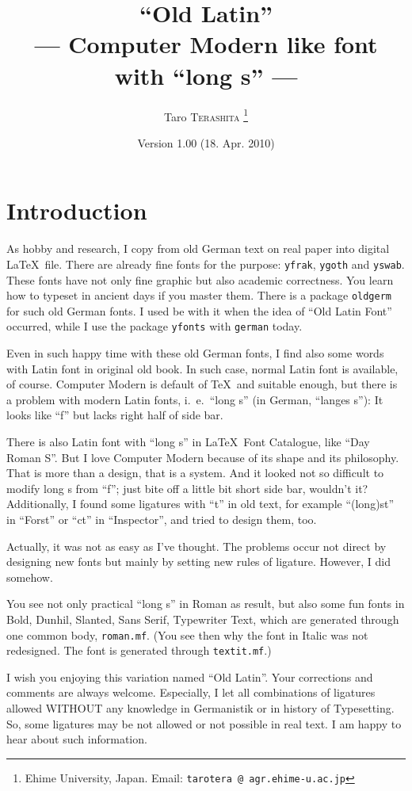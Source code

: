 \documentclass[a4paper]{article}
\title{``Old Latin''\\
--- Computer Modern like font with ``long s'' ---}
\author{Taro \textsc{Terashita}
\thanks{Ehime University, Japan.
Email: \texttt{tarotera @ agr.ehime-u.ac.jp}
}
}
\date{Version 1.00 (18. Apr. 2010)}
\begin{document}
\maketitle
\tableofcontents

\section{Introduction}

As hobby and research,
I copy from old German text on real paper into digital \LaTeX\ file.
There are already fine fonts for the purpose:
\texttt{yfrak}, \texttt{ygoth} and \texttt{yswab}.
These fonts have not only fine graphic but also academic correctness.
You learn how to typeset in ancient days if you master them.
There is a package \texttt{oldgerm} for such old German fonts.
I used be with it when the idea of ``Old Latin Font'' occurred,
while I use the package \texttt{yfonts} with \texttt{german} today.

Even in such happy time with these old German fonts,
I find also some words with Latin font in original old book.
In such case, normal Latin font is available, of course.
Computer Modern is default of \TeX\ and suitable enough,
but there is a problem with modern Latin fonts, i.~e.\ ``long s''
(in German, ``langes s''):
It looks like ``f'' but lacks right half of side bar.

There is also Latin font with ``long s''
in \LaTeX\ Font Catalogue, like ``Day Roman S''.
But I love Computer Modern
because of its shape and its philosophy.
That is more than a design, that is a system.
And it looked not so difficult to modify long s from ``f'';
just bite off a little bit short side bar, wouldn't it?
Additionally,
I found some ligatures with ``t'' in old text,
for example ``(long)st'' in ``Forst'' or ``ct'' in ``Inspector'',
and tried to design them, too.

Actually, it was not as easy as I've thought.
The problems occur not direct by designing new fonts but
mainly by setting new rules of ligature.
However, I did somehow.

You see not only practical ``long s'' in Roman as result,
but also some fun fonts
in Bold, Dunhil, Slanted, Sans Serif, Typewriter Text,
which are generated through one common body, \texttt{roman.mf}.
(You see then why the font in Italic
was not redesigned.
The font is generated through \texttt{textit.mf}.)

I wish you enjoying this variation named ``Old Latin''.
Your corrections and comments are always welcome.
Especially, I let all combinations of ligatures allowed
\uppercase{without} any knowledge in Germanistik or in history of Typesetting.
So, some ligatures may be not allowed or not possible in real text.
I am happy to hear about such information.
\end{document}
